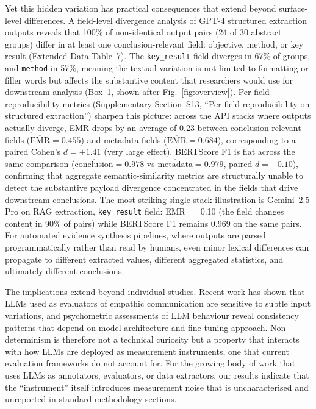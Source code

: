 \documentclass[sn-nature]{sn-jnl}
\begin{document}
Yet this hidden variation has practical consequences that extend beyond surface-level differences.
A field-level divergence analysis of GPT-4 structured extraction outputs reveals that 100\% of non-identical output pairs (24 of 30 abstract groups) differ in at least one conclusion-relevant field: objective, method, or key result (Extended Data Table~7).
The \texttt{key\_result} field diverges in 67\% of groups, and \texttt{method} in 57\%, meaning the textual variation is not limited to formatting or filler words but affects the substantive content that researchers would use for downstream analysis (Box~1, shown after Fig.~\ref{fig:overview}).
Per-field reproducibility metrics (Supplementary Section~S13, ``Per-field reproducibility on structured extraction'') sharpen this picture: across the API stacks where outputs actually diverge, EMR drops by an average of 0.23 between conclusion-relevant fields ($\overline{\text{EMR}}=0.455$) and metadata fields ($\overline{\text{EMR}}=0.684$), corresponding to a paired Cohen's $d=+1.41$ (very large effect). BERTScore F1 is flat across the same comparison ($\overline{\text{conclusion}}=0.978$ vs $\overline{\text{metadata}}=0.979$, paired $d=-0.10$), confirming that aggregate semantic-similarity metrics are structurally unable to detect the substantive payload divergence concentrated in the fields that drive downstream conclusions. The most striking single-stack illustration is Gemini~2.5 Pro on RAG extraction, \texttt{key\_result} field: EMR~=~0.10 (the field changes content in 90\% of pairs) while BERTScore F1 remains 0.969 on the same pairs.
For automated evidence synthesis pipelines, where outputs are parsed programmatically rather than read by humans, even minor lexical differences can propagate to different extracted values, different aggregated statistics, and ultimately different conclusions.

The implications extend beyond individual studies.
Recent work has shown that LLMs used as evaluators of empathic communication are sensitive to subtle input variations\cite{kumar2026reliable}, and psychometric assessments of LLM behaviour reveal consistency patterns that depend on model architecture and fine-tuning approach\cite{serapiogarcía2025psychometric}.
Non-determinism is therefore not a technical curiosity but a property that interacts with how LLMs are deployed as measurement instruments, one that current evaluation frameworks do not account for.
For the growing body of work that uses LLMs as annotators, evaluators, or data extractors, our results indicate that the ``instrument'' itself introduces measurement noise that is uncharacterised and unreported in standard methodology sections.
\end{document}
